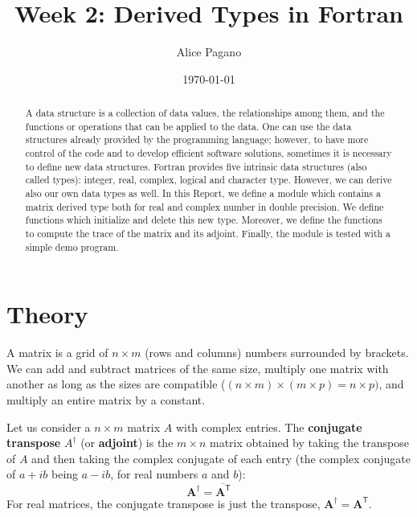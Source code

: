 \documentclass[rmp,10pt,onecolumn,fleqn,notitlepage]{revtex4-1}
\begin{document}
\title{Week 2: Derived Types in Fortran}
\author{Alice Pagano}
\date{\today}

\begin{abstract}
A data structure is a collection of data values, the relationships among them, and the functions or operations that can be applied to the data.
One can use the data structures already provided by the programming language; however, to have more control of the code and to develop efficient software solutions, sometimes it is necessary to define new data structures.
Fortran provides five intrinsic data structures (also called types): integer, real, complex, logical and character type. However, we can derive also our own data types as well.
In this Report, we define a module which contains a matrix derived type both for real and complex number in double precision. We define functions which initialize and delete this new type. Moreover, we define the functions to compute the trace of the matrix and its adjoint. Finally, the module is tested with a simple demo program.
\end{abstract}

\maketitle


\section{Theory}
A matrix is a grid of $n \times m$ (rows and columns) numbers surrounded by brackets.
We can add and subtract matrices of the same size, multiply one matrix with another as long as the sizes are compatible ($(n \times m) \times (m \times p) = n \times p)$, and multiply an entire matrix by a constant.

Let us consider a \( n \times m \) matrix \( A \) with complex entries. The \textbf{conjugate transpose} \( A^{\dagger} \) (or \textbf{adjoint}) is the \( m \times n \) matrix obtained by taking the transpose of \( A \) and then taking the complex conjugate of each entry (the complex conjugate of \( a + i b \) being \( a - i b \), for real numbers \( a \) and \( b \)):
\begin{equation}
  \boldsymbol{A}^\mathsf{\dagger}= \overline{\boldsymbol{A}^\mathsf{T}}
\end{equation}
For real matrices, the conjugate transpose is just the transpose, \( \boldsymbol{A}^\mathsf{\dagger}=  \boldsymbol{A}^\mathsf{T} \).
\end{document}
